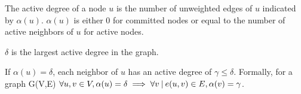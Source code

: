 \begin{ldef}
The active degree of a node $u$ is the number of unweighted edges of $u$ indicated by $\alpha(u)$. $\alpha(u)$ is either 0 for committed nodes or equal to the number of active neighbors of $u$ for active nodes.
\end{ldef}
\begin{ldef}
$\delta$ is the largest active degree in the graph.
\end{ldef}
\begin{ldef}
If $\alpha(u) = \delta$, each neighbor of $u$ has an active degree of $\gamma \le \delta$. Formally, for a graph G(V,E) $\forall u,v \in V, \alpha(u) = \delta \implies  \forall  v {\: |\:} e(u,v) \in E, \alpha (v) = \gamma$.
\end{ldef}

